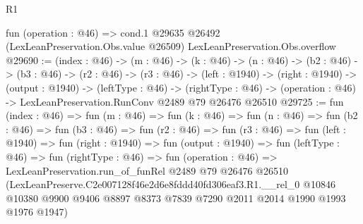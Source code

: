 \begin{lexlean}{R1}
\begin{coremodule}
  fun (operation : @46) =>
  cond.{1} @29635 @26492 (LexLeanPreservation.Obs.value @26509) LexLeanPreservation.Obs.overflow
@29690 := (index : @46) ->
  (m : @46) ->
  (k : @46) ->
  (n : @46) ->
  (b2 : @46) ->
  (b3 : @46) ->
  (r2 : @46) ->
  (r3 : @46) ->
  (left : @1940) ->
  (right : @1940) ->
  (output : @1940) ->
  (leftType : @46) ->
  (rightType : @46) -> (operation : @46) -> LexLeanPreservation.RunConv @2489 @79 @26476 @26510
@29725 := fun (index : @46) =>
  fun (m : @46) =>
  fun (k : @46) =>
  fun (n : @46) =>
  fun (b2 : @46) =>
  fun (b3 : @46) =>
  fun (r2 : @46) =>
  fun (r3 : @46) =>
  fun (left : @1940) =>
  fun (right : @1940) =>
  fun (output : @1940) =>
  fun (leftType : @46) =>
  fun (rightType : @46) =>
  fun (operation : @46) =>
  LexLeanPreservation.run_of_funRel
    @2489
    @79
    @26476
    @26510
    (LexLeanPreserve.C2e007128f46e2d6e8fddd40fd306eaf3.R1.__rel_0
      @10846
      @10380
      @9900
      @9406
      @8897
      @8373
      @7839
      @7290
      @2011
      @2014
      @1990
      @1993
      @1976
      @1947)
\end{coremodule}
\end{lexlean}
